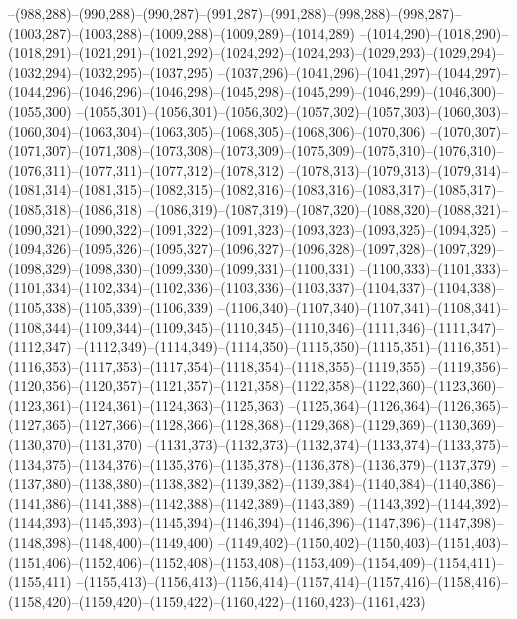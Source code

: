 --(988,288)--(990,288)--(990,287)--(991,287)--(991,288)--(998,288)--(998,287)--(1003,287)--(1003,288)--(1009,288)--(1009,289)--(1014,289)
--(1014,290)--(1018,290)--(1018,291)--(1021,291)--(1021,292)--(1024,292)--(1024,293)--(1029,293)--(1029,294)--(1032,294)--(1032,295)--(1037,295)
--(1037,296)--(1041,296)--(1041,297)--(1044,297)--(1044,296)--(1046,296)--(1046,298)--(1045,298)--(1045,299)--(1046,299)--(1046,300)--(1055,300)
--(1055,301)--(1056,301)--(1056,302)--(1057,302)--(1057,303)--(1060,303)--(1060,304)--(1063,304)--(1063,305)--(1068,305)--(1068,306)--(1070,306)
--(1070,307)--(1071,307)--(1071,308)--(1073,308)--(1073,309)--(1075,309)--(1075,310)--(1076,310)--(1076,311)--(1077,311)--(1077,312)--(1078,312)
--(1078,313)--(1079,313)--(1079,314)--(1081,314)--(1081,315)--(1082,315)--(1082,316)--(1083,316)--(1083,317)--(1085,317)--(1085,318)--(1086,318)
--(1086,319)--(1087,319)--(1087,320)--(1088,320)--(1088,321)--(1090,321)--(1090,322)--(1091,322)--(1091,323)--(1093,323)--(1093,325)--(1094,325)
--(1094,326)--(1095,326)--(1095,327)--(1096,327)--(1096,328)--(1097,328)--(1097,329)--(1098,329)--(1098,330)--(1099,330)--(1099,331)--(1100,331)
--(1100,333)--(1101,333)--(1101,334)--(1102,334)--(1102,336)--(1103,336)--(1103,337)--(1104,337)--(1104,338)--(1105,338)--(1105,339)--(1106,339)
--(1106,340)--(1107,340)--(1107,341)--(1108,341)--(1108,344)--(1109,344)--(1109,345)--(1110,345)--(1110,346)--(1111,346)--(1111,347)--(1112,347)
--(1112,349)--(1114,349)--(1114,350)--(1115,350)--(1115,351)--(1116,351)--(1116,353)--(1117,353)--(1117,354)--(1118,354)--(1118,355)--(1119,355)
--(1119,356)--(1120,356)--(1120,357)--(1121,357)--(1121,358)--(1122,358)--(1122,360)--(1123,360)--(1123,361)--(1124,361)--(1124,363)--(1125,363)
--(1125,364)--(1126,364)--(1126,365)--(1127,365)--(1127,366)--(1128,366)--(1128,368)--(1129,368)--(1129,369)--(1130,369)--(1130,370)--(1131,370)
--(1131,373)--(1132,373)--(1132,374)--(1133,374)--(1133,375)--(1134,375)--(1134,376)--(1135,376)--(1135,378)--(1136,378)--(1136,379)--(1137,379)
--(1137,380)--(1138,380)--(1138,382)--(1139,382)--(1139,384)--(1140,384)--(1140,386)--(1141,386)--(1141,388)--(1142,388)--(1142,389)--(1143,389)
--(1143,392)--(1144,392)--(1144,393)--(1145,393)--(1145,394)--(1146,394)--(1146,396)--(1147,396)--(1147,398)--(1148,398)--(1148,400)--(1149,400)
--(1149,402)--(1150,402)--(1150,403)--(1151,403)--(1151,406)--(1152,406)--(1152,408)--(1153,408)--(1153,409)--(1154,409)--(1154,411)--(1155,411)
--(1155,413)--(1156,413)--(1156,414)--(1157,414)--(1157,416)--(1158,416)--(1158,420)--(1159,420)--(1159,422)--(1160,422)--(1160,423)--(1161,423)
